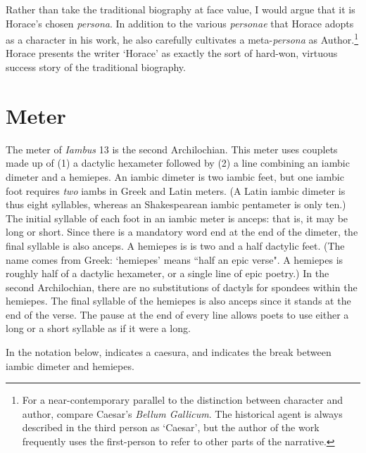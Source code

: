 Rather than take the traditional biography at face value, I would argue that it is Horace's chosen \textit{persona}.  In addition to the various \textit{personae} that Horace adopts as a character in his work, he also carefully cultivates a meta-\textit{persona} as Author.\footnote{For a near-contemporary parallel to the distinction between character and author, compare Caesar's \textit{Bellum Gallicum}.  The historical agent is always described in the third person as `Caesar', but the author of the work frequently uses the first-person to refer to other parts of the narrative.}  Horace presents the writer `Horace' as exactly the sort of hard-won, virtuous success story of the traditional biography.






\section*{Meter}

The meter of \textit{Iambus} 13 is the second Archilochian. This meter uses couplets made up of (1) a dactylic hexameter followed by (2) a line combining an iambic dimeter and a hemiepes.  An iambic dimeter is two iambic feet, but one iambic foot requires \textit{two} iambs in Greek and Latin meters.  (A Latin iambic dimeter is thus eight syllables, whereas an Shakespearean iambic pentameter is only ten.)  The initial syllable of each foot in an iambic meter is anceps: that is, it may be long or short.  Since there is a mandatory word end at the end of the dimeter, the final syllable is also anceps.  A hemiepes is is two and a half dactylic feet.  (The name comes from Greek: `hemiepes' means ``half an epic verse".  A hemiepes is roughly half of a dactylic hexameter, or a single line of epic poetry.)  In the second Archilochian, there are no substitutions of dactyls for spondees within the hemiepes.  The final syllable of the hemiepes is also anceps since it stands at the end of the verse.  The pause at the end of every line allows poets to use either a long or a short syllable as if it were a long.

In the notation below, \metra{\c} indicates a caesura, and \metra{\cc} indicates the break between iambic dimeter and hemiepes.\newline


